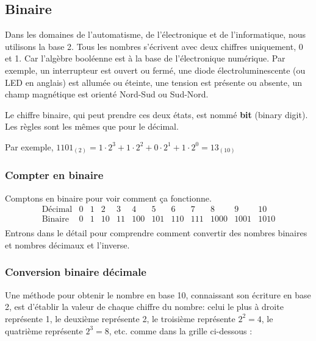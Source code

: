 \documentclass[11pt, a4paper]{book}
\begin{document}
\subsection{Binaire}

Dans les domaines de l'automatisme, de l'électronique et de l'informatique, nous utilisons la base 2. Tous les nombres s'écrivent avec deux chiffres uniquement, 0 et 1.  Car l'algèbre booléenne est à la base de l'électronique numérique. Par exemple, un interrupteur est ouvert ou fermé, une diode électroluminescente (ou LED en anglais) est allumée ou éteinte,  une tension est présente ou absente, un champ magnétique est orienté Nord-Sud ou Sud-Nord.

Le chiffre binaire, qui peut prendre ces deux états, est nommé {\bf bit} (binary digit). Les règles sont les mêmes que pour le décimal. 

Par exemple, $1101_{(2)}=1 \cdot 2^3 + 1 \cdot 2^2 + 0 \cdot 2^1 + 1\cdot 2^0=13_{(10)}$ 

\subsubsection{Compter en binaire}
Comptons en binaire pour voir comment ça fonctionne.
\[
\begin{array}{cccccccccccc}
\text{Décimal} & 0 & 1 & 2 & 3 & 4 & 5 & 6 & 7 & 8 & 9 & 10 \\
\text{Binaire} & 0 & 1 & 10 & 11 & 100 & 101 & 110 & 111 & 1000 & 1001 & 1010 \\
\end{array}
\]
Entrons dans le détail pour comprendre comment convertir des nombres binaires et nombres décimaux et l'inverse.
\subsubsection{Conversion binaire décimale}

Une méthode pour obtenir le nombre en base 10, connaissant son écriture en base 2, est d'établir la valeur de chaque chiffre du nombre: celui le plus à droite représente 1, le deuxième représente 2, le troisième représente $2^2=4$, le quatrième représente $2^3=8$, etc. comme dans la grille ci-dessous :  

\begin{center}
\end{center} 
\end{document}
